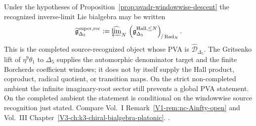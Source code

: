 \begin{remark}
\label{rem:pvadr-weight-completed}
Under the hypotheses of Proposition~\ref{prop:pvadr-windowwise-descent}
the recognized inverse-limit Lie bialgebra may be written
\[
 \widehat{\mathfrak g}^{\mathrm{super},\mathrm{rec}}_{\Delta_5}
 :=
 \widehat{\varprojlim}_{N}\,
 \left(
 \mathfrak g_{\Delta_5}^{\mathrm{Hall},\le N}
 \right)_{\!/\operatorname{Rad}_N}.
\]
This is the completed source-recognized object whose PVA is
$\widehat{\mathcal D}_{\Delta_5}$.  The Gritsenko lift of
$\eta^9\theta_1$ to $\Delta_5$ supplies the automorphic denominator
target and the finite Borcherds coefficient windows; it does not by
itself supply the Hall product, coproduct, radical quotient, or
transition maps.  On the strict non-completed ambient the infinite
imaginary-root sector still prevents a global PVA statement.  On the
completed ambient the statement is conditional on the windowwise
source recognition just stated.  Compare Vol.~I
Remark~\ref{V1-rem:nc-Ainfty-open} and Vol.~III
Chapter~\ref{V3-ch:k3-chiral-bialgebra-platonic}.
\cite{GritsenkoNikulin1998,Gritsenko1999,Lusztig1990,KhanZeng2025}.
\end{remark}
